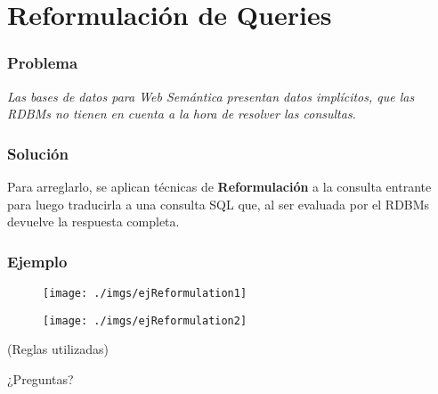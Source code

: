 \documentclass{beamer}
\begin{document}
\section{Reformulación de Queries}
\begin{frame}
\frametitle{Problema}
\centering
\textit{Las bases de datos para Web Semántica presentan datos implícitos, que las RDBMs no tienen en cuenta a la hora de resolver las consultas.}
\end{frame}	

\begin{frame}
\frametitle{Solución}
Para arreglarlo, se aplican técnicas de \textbf{Reformulación} a la consulta entrante para luego traducirla a una consulta SQL que, al ser evaluada por el RDBMs devuelve la respuesta completa.
\end{frame}	


\begin{frame}
\frametitle{Ejemplo}
\begin{figure}[H]
\begin{center}
\texttt{[image: ./imgs/ejReformulation1]}
\end{center}
\end{figure}

\begin{figure}[H]
\begin{center}
\texttt{[image: ./imgs/ejReformulation2]}
\end{center}
\end{figure}

\begin{center}
(Reglas utilizadas)
\end{center}

\end{frame}	

\begin{frame}
\Huge{\centerline{¿Preguntas?}}
\end{frame}

\end{document}
